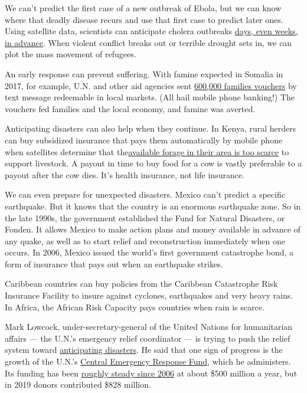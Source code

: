 We can't predict the first case of a new outbreak of Ebola, but we can
know where that deadly disease recurs and use that first case to predict
later ones. Using satellite data, scientists can anticipate cholera
outbreaks \href{https://www.bbc.com/news/health-45259922}{days, even
weeks, in advance}. When violent conflict breaks out or terrible drought
sets in, we can plot the mass movement of refugees.

An early response can prevent suffering. With famine expected in Somalia
in 2017, for example, U.N. and other aid agencies sent
\href{https://reliefweb.int/report/somalia/how-aid-cash-not-goods-averted-famine-somalia}{600,000
families vouchers} by text message redeemable in local markets. (All
hail mobile phone banking!) The vouchers fed families and the local
economy, and famine was averted.

Anticipating disasters can also help when they continue. In Kenya, rural
herders can buy subsidized insurance that pays them automatically by
mobile phone when satellites determine that
the\href{https://www.nytimes3xbfgragh.onion/2016/11/08/opinion/up-in-the-sky-help-to-keep-africans-from-starving.html}{available
forage in their area is too scarce} to support livestock. A payout in
time to buy food for a cow is vastly preferable to a payout after the
cow dies. It's health insurance, not life insurance.

We can even prepare for unexpected disasters. Mexico can't predict a
specific earthquake. But it knows that the country is an enormous
earthquake zone. So in the late 1990s, the government established the
Fund for Natural Disasters, or Fonden. It allows Mexico to make action
plans and money available in advance of any quake, as well as to start
relief and reconstruction immediately when one occurs. In 2006, Mexico
issued the world's first government catastrophe bond, a form of
insurance that pays out when an earthquake strikes.

Caribbean countries can buy policies from the Caribbean Catastrophe Risk
Insurance Facility to insure against cyclones, earthquakes and very
heavy rains. In Africa, the African Risk Capacity pays countries when
rain is scarce.

Mark Lowcock, under-secretary-general of the United Nations for
humanitarian affairs --- the U.N.'s emergency relief coordinator --- is
trying to push the relief system toward
\href{https://reliefweb.int/report/world/mark-lowcock-under-secretary-general-humanitarian-affairs-and-emergency-relief}{anticipating
disasters}. He said that one sign of progress is the growth of the
U.N.'s \href{https://cerf.un.org/}{Central Emergency Response Fund},
which he administers. Its funding has been
\href{https://cerf.un.org/our-donors/contributions}{roughly steady since
2006} at about \$500 million a year, but in 2019 donors contributed
\$828 million.

